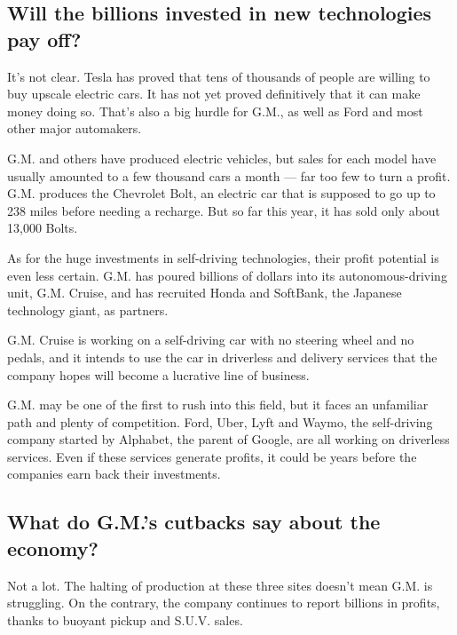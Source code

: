 \hypertarget{will-the-billions-invested-in-new-technologies-pay-off}{%
\subsection{Will the billions invested in new technologies pay
off?}\label{will-the-billions-invested-in-new-technologies-pay-off}}

It's not clear. Tesla has proved that tens of thousands of people are
willing to buy upscale electric cars. It has not yet proved definitively
that it can make money doing so. That's also a big hurdle for G.M., as
well as Ford and most other major automakers.

G.M. and others have produced electric vehicles, but sales for each
model have usually amounted to a few thousand cars a month --- far too
few to turn a profit. G.M. produces the Chevrolet Bolt, an electric car
that is supposed to go up to 238 miles before needing a recharge. But so
far this year, it has sold only about 13,000 Bolts.

As for the huge investments in self-driving technologies, their profit
potential is even less certain. G.M. has poured billions of dollars into
its autonomous-driving unit, G.M. Cruise, and has recruited Honda and
SoftBank, the Japanese technology giant, as partners.

G.M. Cruise is working on a self-driving car with no steering wheel and
no pedals, and it intends to use the car in driverless and delivery
services that the company hopes will become a lucrative line of
business.

G.M. may be one of the first to rush into this field, but it faces an
unfamiliar path and plenty of competition. Ford, Uber, Lyft and Waymo,
the self-driving company started by Alphabet, the parent of Google, are
all working on driverless services. Even if these services generate
profits, it could be years before the companies earn back their
investments.

\hypertarget{what-do-gms-cutbacks-say-about-the-economy}{%
\subsection{What do G.M.'s cutbacks say about the
economy?}\label{what-do-gms-cutbacks-say-about-the-economy}}

Not a lot. The halting of production at these three sites doesn't mean
G.M. is struggling. On the contrary, the company continues to report
billions in profits, thanks to buoyant pickup and S.U.V. sales.

